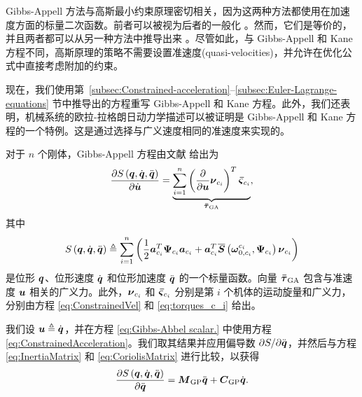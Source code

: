 Gibbs-Appell 方法与高斯最小约束原理密切相关，因为这两种方法都使用在加速度方面的标量二次函数。前者可以被视为后者的一般化 \cite{Ray1972,JRay92}。然而，它们是等价的，并且两者都可以从另一种方法中推导出来 \cite{Ray1972,Lewis1996,Udwadia1998}。尽管如此，与 Gibbs-Appell 和 Kane 方程不同，高斯原理的策略不需要设置准速度(quasi-velocities)，并允许在优化公式中直接考虑附加的约束。

现在，我们使用第~\ref{subsec:Constrained-acceleration}--\ref{subsec:Euler-Lagrange-equations} 节中推导出的方程重写 Gibbs-Appell 和 Kane 方程。此外，我们还表明，机械系统的欧拉-拉格朗日动力学描述可以被证明是 Gibbs-Appell 和 Kane 方程的一个特例。这是通过选择与广义速度相同的准速度来实现的。

对于 $n$ 个刚体，Gibbs-Appell 方程由文献 \cite{Honein2021} 给出为
\begin{equation}
\frac{\partial S\left(\boldsymbol{q},\dot{\boldsymbol{q}},\ddot{\boldsymbol{q}}\right)}{\partial\dot{\boldsymbol{u}}}=\underset{\boldsymbol{\bar{\tau}}_{\mathrm{GA}}}{\underbrace{\underset{i=1}{\sum^{n}}\left(\frac{\partial}{\partial\boldsymbol{u}}\boldsymbol{\nu}_{c_{i}}\right)^{T}\boldsymbol{\bar{\varsigma}}_{c_{i}}}},\label{eq:gibbs_appell_init}
\end{equation}
其中 
\begin{equation}
S\left(\boldsymbol{q},\dot{\boldsymbol{q}},\ddot{\boldsymbol{q}}\right)\triangleq\underset{i=1}{\sum^{n}}\left(\frac{1}{2}\boldsymbol{a}_{c_{i}}^{T}\boldsymbol{\Psi}_{c_{i}}\boldsymbol{a}_{c_{i}}+\boldsymbol{a}_{c_{i}}^{T}\overline{\boldsymbol{S}}\left(\boldsymbol{\omega}_{0,c_{i}}^{c_{i}},\boldsymbol{\Psi}_{c_{i}}\right)\boldsymbol{\nu}_{c_{i}}\right)\label{eq:Gibbs-Abbel scalar.}
\end{equation}
是位形 $\boldsymbol{q}$、位形速度 $\dot{\boldsymbol{q}}$ 和位形加速度 $\ddot{\boldsymbol{q}}$ 的一个标量函数。向量 $\boldsymbol{\bar{\tau}}_{\mathrm{GA}}$ 包含与准速度 $\boldsymbol{u}$ 相关的广义力。此外，$\boldsymbol{\nu}_{c_{i}}$ 和 $\boldsymbol{\bar{\varsigma}}_{c_{i}}$ 分别是第 $i$ 个机体的运动旋量和广义力，分别由方程 \eqref{eq:ConstrainedVel} 和 \eqref{eq:torques_c_i} 给出。

我们设 $\boldsymbol{u}\triangleq\dot{\boldsymbol{q}}$，并在方程 \eqref{eq:Gibbs-Abbel scalar.} 中使用方程 \eqref{eq:ConstrainedAcceleration}。我们取其结果并应用偏导数 $\partial S/\partial\ddot{\boldsymbol{q}}$，并然后与方程 \eqref{eq:InertiaMatrix} 和  \eqref{eq:CoriolisMatrix} 进行比较，以获得
\begin{equation}
\frac{\partial S\left(\boldsymbol{q},\dot{\boldsymbol{q}},\ddot{\boldsymbol{q}}\right)}{\partial\ddot{\boldsymbol{q}}}=\boldsymbol{M}_{\text{GP}}\ddot{\boldsymbol{q}}+\boldsymbol{C}_{\text{GP}}\dot{\boldsymbol{q}}.\label{eq:gibbs_appell_right}
\end{equation}

